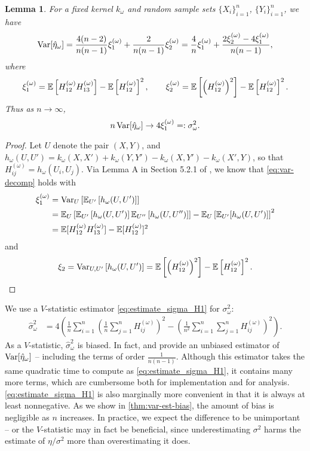 \documentclass{article}
\newtheorem{lemma}[theorem]{Lemma} \crefname{lemma}{Lemma}{Lemmas}
\begin{document}
\begin{lemma} \label{thm:var-decomp}
    For a fixed kernel $k_\omega$ and random sample sets $\{X_i\}_{i=1}^n$, $\{Y_i\}_{i=1}^n$,
    we have
    \begin{equation} \label{eq:var-decomp}
        \operatorname{Var}[\hat\eta_\omega]
        = \frac{4(n-2)}{n (n-1)} \xi_1^{(\omega)} + \frac{2}{n (n-1)} \xi_2^{(\omega)}
        = \frac4n \xi_1^{(\omega)} + \frac{2 \xi_2^{(\omega)} - 4 \xi_1^{(\omega)}}{n (n-1)}
    ,\end{equation}
    where
    \[
        \xi_1^{(\omega)} = \operatorname{\mathbb{E}}\left[H_{12}^{(\omega)} H_{13}^{(\omega)}\right]
              - \operatorname{\mathbb{E}}\left[H_{12}^{(\omega)}\right]^2
        ,\qquad
        \xi_2^{(\omega)} = \operatorname{\mathbb{E}}\left[\left(H_{12}^{(\omega)}\right)^2\right]
              - \operatorname{\mathbb{E}}\left[H_{12}^{(\omega)}\right]^2
    .\]
    Thus as $n \to \infty$,
    \[
        n \operatorname{Var}[\hat\eta_\omega] \to 4 \xi_1^{(\omega)} =: \sigma_\omega^2
    .\]
\end{lemma}
\begin{proof}
Let $U$ denote the pair $(X, Y)$,
and $h_\omega(U, U') = k_\omega(X, X') + k_\omega(Y, Y') - k_\omega(X, Y') - k_\omega(X', Y)$,
so that $H_{ij}^{(\omega)} = h_\omega(U_i, U_j)$.
Via Lemma A in Section 5.2.1 of \citet{serfling},
we know that \eqref{eq:var-decomp} holds with
\begin{align*}
    \xi_1^{(\omega)}
  &= \operatorname{Var}_U\left[ \operatorname{\mathbb{E}}_{U'}\left[ h_\omega(U, U') \right]\right]
\\&= \operatorname{\mathbb{E}}_U\left[ \operatorname{\mathbb{E}}_{U'}\left[ h_\omega(U, U') \right] \operatorname{\mathbb{E}}_{U''}\left[ h_\omega(U, U'') \right] \right]
   - \operatorname{\mathbb{E}}_U\left[ \operatorname{\mathbb{E}}_{U'}[ h_\omega(U, U') ] \right]^2
\\&= \operatorname{\mathbb{E}}[ H_{12}^{(\omega)} H_{13}^{(\omega)} ] - \operatorname{\mathbb{E}}[ H_{12}^{(\omega)} ]^2
\end{align*}
and
\[
    \xi_2
   = \operatorname{Var}_{U, U'}\left[ h_\omega(U, U') \right]
   = \operatorname{\mathbb{E}}\left[ \left(H_{12}^{(\omega)}\right)^2 \right]
   - \operatorname{\mathbb{E}}\left[H_{12}^{(\omega)}\right]^2
.\qedhere\]
\end{proof}

We use a $V$-statistic estimator \eqref{eq:estimate_sigma_H1} for $\sigma_\omega^2$:
\begin{align*}
     \hat\sigma_\omega^2
  &= 4 \left(
        \frac{1}{n} \sum_{i=1}^n
          \left( \frac1n \sum_{j=1}^n H_{ij}^{(\omega)} \right)^2
      - \left( \frac{1}{n^2} \sum_{i=1}^n \sum_{j=1}^n H_{ij}^{(\omega)} \right)^2
     \right)
.\end{align*}
As a $V$-statistic,
$\hat\sigma_\omega^2$ is biased.
In fact, \citet{sutherland:mmd-opt} and \citet{unbiased-var-ests} provide an unbiased estimator of $\operatorname{Var}[\hat\eta_\omega]$ -- including the terms of order $\frac{1}{n (n-1)}$.
Although this estimator takes the same quadratic time to compute as \eqref{eq:estimate_sigma_H1},
it contains many more terms, which are cumbersome both for implementation and for analysis.
\eqref{eq:estimate_sigma_H1} is also marginally more convenient in that it is always at least nonnegative.
As we show in \cref{thm:var-est-bias},
the amount of bias is negligible as $n$ increases.
In practice, we expect the difference to be unimportant
-- or the $V$-statistic may in fact be beneficial, since underestimating $\sigma^2$ harms the estimate of ${\eta}/{\sigma^2}$ more than overestimating it does.
\end{document}
